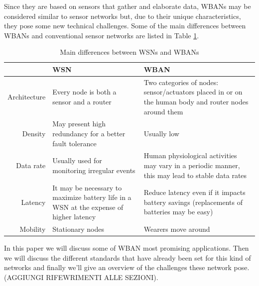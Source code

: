 \documentclass[conference]{IEEEtran}
\begin{document}
Since they are based on sensors that gather and elaborate data, WBANs may be considered similar to sensor networks but, due to their unique characteristics, they pose some new technical challenges. Some of the main differences between WBANs and conventional sensor networks are listed in Table \ref{tab1}.

\begin{table}[htbp]
	\caption{Main differences between WSNs and WBANs}
	\begin{tabularx}{0.5\textwidth}{r|X|X|}
	 & \textbf{WSN} & \textbf{WBAN} \\
	\hline
	Architecture & Every node is both a sensor and a router & Two categories of nodes: sensor/actuators placed in or on the human body and router nodes around them \\
	\hline
	Density & May present high redundancy for a better fault tolerance & Usually low \\
	\hline
	Data rate & Usually used for monitoring irregular events & Human physiological activities may vary in a periodic manner, this may lead to stable data rates \\
	\hline
	Latency	& It may be necessary to maximize battery life in a WSN at the expense of higher latency & Reduce latency even if it impacts battery savings (replacements of batteries may be easy) \\
	\hline
	Mobility & Stationary nodes & Wearers move around \\
	\hline
	\end{tabularx}
	\label{tab1}
	\end{table}

In this paper we will discuss some of WBAN most promising applications. Then we will discuss the different standards that have already been set for this kind of networks and finally we’ll give an overview of the challenges these network pose. (AGGIUNGI RIFEWRIMENTI ALLE SEZIONI).
\end{document}
